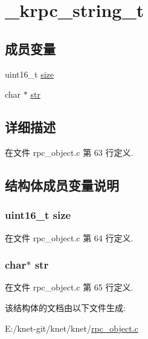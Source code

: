 \hypertarget{struct__krpc__string__t}{}\section{\+\_\+krpc\+\_\+string\+\_\+t}
\label{struct__krpc__string__t}
\subsection*{成员变量}
\begin{DoxyCompactItemize}
\item 
uint16\+\_\+t \hyperlink{struct__krpc__string__t_aaba88b24a21a6c70c895c0d55f4a69a0}{size}
\item 
char $\ast$ \hyperlink{struct__krpc__string__t_ab50d783982593ef993ea0b68f7ad8b80}{str}
\end{DoxyCompactItemize}


\subsection{详细描述}


在文件 rpc\+\_\+object.\+c 第 63 行定义.



\subsection{结构体成员变量说明}
\hypertarget{struct__krpc__string__t_aaba88b24a21a6c70c895c0d55f4a69a0}{}
\subsubsection[{size}]{\setlength{\rightskip}{0pt plus 5cm}uint16\+\_\+t size}\label{struct__krpc__string__t_aaba88b24a21a6c70c895c0d55f4a69a0}


在文件 rpc\+\_\+object.\+c 第 64 行定义.

\hypertarget{struct__krpc__string__t_ab50d783982593ef993ea0b68f7ad8b80}{}
\subsubsection[{str}]{\setlength{\rightskip}{0pt plus 5cm}char$\ast$ str}\label{struct__krpc__string__t_ab50d783982593ef993ea0b68f7ad8b80}


在文件 rpc\+\_\+object.\+c 第 65 行定义.



该结构体的文档由以下文件生成\+:\begin{DoxyCompactItemize}
\item 
E\+:/knet-\/git/knet/knet/\hyperlink{rpc__object_8c}{rpc\+\_\+object.\+c}\end{DoxyCompactItemize}
